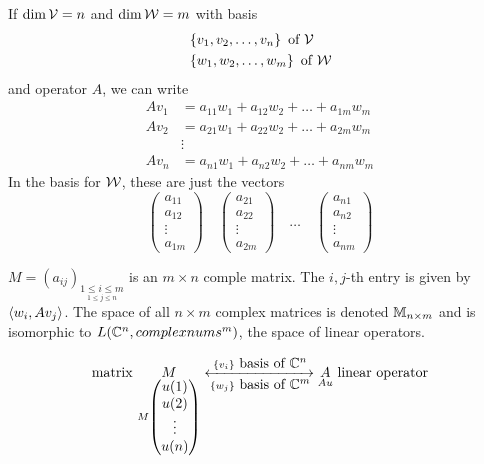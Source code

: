 If $\dim \mathcal{V} = n$ and $\dim \mathcal{W} = m$ with basis
\begin{align*}
     & \left\lbrace v_1, v_2, \dots, v_n\right\rbrace \hbox{ of $\mathcal{V}$} \\
     & \left\lbrace w_1, w_2, \dots, w_m\right\rbrace \hbox{ of $\mathcal{W}$}
\end{align*}
and operator $A$, we can write
\begin{align*}
    Av_1 & = a_{11}w_1 + a_{12}w_2 + \dots + a_{1m}w_m \\
    Av_2 & = a_{21}w_1 + a_{22}w_2 + \dots + a_{2m}w_m \\
         & \vdots                                      \\
    Av_n & = a_{n1}w_1 + a_{n2}w_2 + \dots + a_{nm}w_m
\end{align*}
In the basis for $\mathcal{W}$, these are just the vectors
\[\begin{pmatrix}a_{11}\\a_{12}\\\vdots\\a_{1m}\end{pmatrix}\quad\begin{pmatrix}a_{21}\\a_{22}\\\vdots\\a_{2m}\end{pmatrix}\quad\dots\quad\begin{pmatrix}a_{n1}\\a_{n2}\\\vdots\\a_{nm}\end{pmatrix}\]


$M = (a_{ij})_{\underset{1\leq j \leq n}{1\leq i\leq m}}$ is an $m \times n$ comple
matrix. The $i, j$-th entry is given by $\left\langle w_i, Av_j\right\rangle$. The space of
all $n \times m$ complex matrices is denoted $\mathbb{M}_{n\times m}$ and is isomorphic
to $L(\mathbb{C}^n, complexnums^m)$, the space of linear operators.

\[\hbox{matrix }\underset{M\begin{pmatrix}u(1)\\u(2)\\\vdots\\u(n)\end{pmatrix}}{M} \xleftrightarrow[\left\lbrace w_j\right\rbrace\hbox{ basis of $\mathbb{C}^m$}]{\left\lbrace v_i\right\rbrace\hbox{ basis of $\mathbb{C}^n$}}\underset{Au}{A}\hbox{ linear operator}\]

